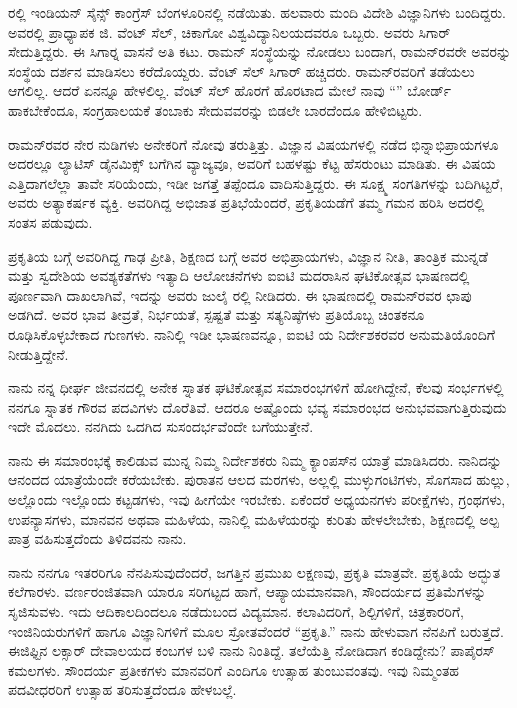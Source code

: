ರಲ್ಲಿ ಇಂಡಿಯನ್ ಸೈನ್ಸ್ ಕಾಂಗ್ರೆಸ್ ಬೆಂಗಳೂರಿನಲ್ಲಿ ನಡೆಯಿತು. ಹಲವಾರು ಮಂದಿ ವಿದೇಶಿ ವಿಜ್ಞಾನಿಗಳು ಬಂದಿದ್ದರು. ಅವರಲ್ಲಿ ಪ್ರಾಧ್ಯಾಪಕ ಜಿ. ವೆಂಟ್ ಸೆಲ್, ಚಿಕಾಗೋ ವಿಶ್ವವಿದ್ಯಾನಿಲಯದವರೂ ಒಬ್ಬರು. ಅವರು ಸಿಗಾರ್ ಸೇದುತ್ತಿದ್ದರು. ಈ ಸಿಗಾರ್‍ನ ವಾಸನೆ ಅತಿ ಕಟು. ರಾಮನ್ ಸಂಸ್ಥೆಯನ್ನು ನೋಡಲು ಬಂದಾಗ, ರಾಮನ್‍ರವರೇ ಅವರನ್ನು ಸಂಸ್ಥೆಯ ದರ್ಶನ ಮಾಡಿಸಲು ಕರೆದೊಯ್ದರು. ವೆಂಟ್ ಸೆಲ್ ಸಿಗಾರ್ ಹಚ್ಚಿದರು. ರಾಮನ್‍ರವರಿಗೆ ತಡೆಯಲು ಆಗಲಿಲ್ಲ. ಆದರೆ ಏನನ್ನೂ ಹೇಳಲಿಲ್ಲ. ವೆಂಟ್ ಸೆಲ್ ಹೊರಗೆ ಹೊರಟಾದ ಮೇಲೆ ನಾವು “” ಬೋರ್ಡ್ ಹಾಕಬೇಕೆಂದೂ, ಸಂಗ್ರಹಾಲಯಕೆ ತಂಬಾಕು ಸೇದುವವರನ್ನು ಬಿಡಲೇ ಬಾರದೆಂದೂ ಹೇಳಿಬಿಟ್ಟರು.

\vskip 2pt

ರಾಮನ್‍ರವರ ನೇರ ನುಡಿಗಳು ಅನೇಕರಿಗೆ ನೋವು ತರುತ್ತಿತ್ತು. ವಿಜ್ಞಾನ ವಿಷಯಗಳಲ್ಲಿ ನಡೆದ ಭಿನ್ನಾಭಿಪ್ರಾಯಗಳೂ ಅದರಲ್ಲೂ ಲ್ಯಾಟಿಸ್ ಡೈನಮಿಕ್ಸ್ ಬಗೆಗಿನ ವ್ಯಾಜ್ಯವೂ, ಅವರಿಗೆ ಬಹಳಷ್ಟು ಕೆಟ್ಟ ಹೆಸರುಂಟು ಮಾಡಿತು. ಈ ವಿಷಯ ಎತ್ತಿದಾಗಲೆಲ್ಲಾ ತಾವೇ ಸರಿಯೆಂದು, ಇಡೀ ಜಗತ್ತೆ ತಪ್ಪೆಂದೂ ವಾದಿಸುತ್ತಿದ್ದರು. ಈ ಸೂಕ್ಷ್ಮ ಸಂಗತಿಗಳನ್ನು ಬದಿಗಿಟ್ಟರೆ, ಅವರು ಅತ್ಯಾಕರ್ಷಕ ವ್ಯಕ್ತಿ. ಅವರಿಗಿದ್ದ ಅಭಿಜಾತ ಪ್ರತಿಭೆಯೆಂದರೆ, ಪ್ರಕೃತಿಯಡೆಗೆ ತಮ್ಮ ಗಮನ ಹರಿಸಿ ಅದರಲ್ಲಿ ಸಂತಸ ಪಡುವುದು.

\vskip 2pt

ಪ್ರಕೃತಿಯ ಬಗ್ಗೆ ಅವರಿಗಿದ್ದ ಗಾಢ ಪ್ರೀತಿ, ಶಿಕ್ಷಣದ ಬಗ್ಗೆ ಅವರ ಅಭಿಪ್ರಾಯಗಳು, ವಿಜ್ಞಾನ ನೀತಿ, ತಾಂತ್ರಿಕ ಮುನ್ನಡೆ ಮತ್ತು ಸ್ವದೇಶಿಯ ಅವಶ್ಯಕತೆಗಳು ಇತ್ಯಾದಿ ಆಲೋಚನೆಗಳು ಐಐಟಿ ಮದರಾಸಿನ ಘಟಿಕೋತ್ಸವ ಭಾಷಣದಲ್ಲಿ ಪೂರ್ಣವಾಗಿ ದಾಖಲಾಗಿವೆ, ಇದನ್ನು ಅವರು  ಜುಲೈ ರಲ್ಲಿ ನೀಡಿದರು. ಈ ಭಾಷಣದಲ್ಲಿ ರಾಮನ್‍ರವರ ಛಾಪು ಅಡಗಿದೆ. ಅವರ ಭಾವ ತೀವ್ರತೆ, ನಿರ್ಭಯತೆ, ಸ್ಪಷ್ಟತೆ ಮತ್ತು ಸತ್ಯನಿಷ್ಠೆಗಳು ಪ್ರತಿಯೊಬ್ಬ ಚಿಂತಕನೂ ರೂಢಿಸಿಕೊಳ್ಳಬೇಕಾದ ಗುಣಗಳು. ನಾನಿಲ್ಲಿ ಇಡೀ ಭಾಷಣವನ್ನೂ, ಐಐಟಿ ಯ ನಿರ್ದೇಶಕರವರ ಅನುಮತಿಯೊಂದಿಗೆ ನೀಡುತ್ತಿದ್ದೇನೆ.



ನಾನು ನನ್ನ ಧೀರ್ಘ ಜೀವನದಲ್ಲಿ ಅನೇಕ ಸ್ನಾತಕ ಘಟಿಕೋತ್ಸವ ಸಮಾರಂಭಗಳಿಗೆ ಹೋಗಿದ್ದೇನೆ, ಕೆಲವು ಸಂರ್ಭಗಳಲ್ಲಿ ನನಗೂ ಸ್ನಾತಕ ಗೌರವ ಪದವಿಗಳು ದೊರೆತಿವೆ. ಆದರೂ ಅಷ್ಟೊಂದು ಭವ್ಯ ಸಮಾರಂಭದ ಅನುಭವವಾಗುತ್ತಿರುವುದು ಇದೇ ಮೊದಲು. ನನಗಿದು ಒದಗಿದ ಸುಸಂದರ್ಭವೆಂದೇ ಬಗೆಯುತ್ತೇನೆ.

ನಾನು ಈ ಸಮಾರಂಭಕ್ಕೆ ಕಾಲಿಡುವ ಮುನ್ನ ನಿಮ್ಮ ನಿರ್ದೇಶಕರು ನಿಮ್ಮ ಕ್ಯಾಂಪಸ್‍ನ ಯಾತ್ರೆ ಮಾಡಿಸಿದರು. ನಾನಿದನ್ನು ಆನಂದದ ಯಾತ್ರೆಯೆಂದೇ ಕರೆಯಬೇಕು. ಪುರಾತನ ಆಲದ ಮರಗಳು, ಅಲ್ಲಲ್ಲಿ ಮುಳ್ಳುಗಂಟಿಗಳು, ಸೊಗಸಾದ ಹುಲ್ಲು, ಅಲ್ಲೊಂದು ಇಲ್ಲೊಂದು ಕಟ್ಟಡಗಳು,\enginline{-} ಇವು ಹೀಗೆಯೇ ಇರಬೇಕು. ಏಕೆಂದರೆ ಅಧ್ಯಯನಗಳು ಪರೀಕ್ಷೆಗಳು, ಗ್ರಂಥಗಳು, ಉಪನ್ಯಾಸಗಳು, ಮಾನವನ ಅಥವಾ ಮಹಿಳೆಯ, ನಾನಿಲ್ಲಿ ಮಹಿಳೆಯರನ್ನು ಕುರಿತು ಹೇಳಲೇಬೇಕು, ಶಿಕ್ಷಣದಲ್ಲಿ ಅಲ್ಪ ಪಾತ್ರ ವಹಿಸುತ್ತದೆಂದು ತಿಳಿದವನು ನಾನು.

\newpage

ನಾನು ನನಗೂ ಇತರರಿಗೂ ನೆನಪಿಸುವುದೆಂದರೆ, ಜಗತ್ತಿನ ಪ್ರಮುಖ ಲಕ್ಷಣವು, ಪ್ರಕೃತಿ ಮಾತ್ರವೇ. ಪ್ರಕೃತಿಯೆ ಅದ್ಭುತ ಕಲೆಗಾರಳು. ವರ್ಣರಂಜಿತವಾಗಿ ಯಾರೂ ಸರಿಗಟ್ಟದ ಹಾಗೆ, ಆಪ್ಯಾಯಮಾನವಾಗಿ, ಸೌಂದರ್ಯದ ಪ್ರತಿಮೆಗಳನ್ನು ಸೃಜಿಸುವಳು. ಇದು ಆದಿಕಾಲದಿಂದಲೂ ನಡೆದುಬಂದ ವಿದ್ಯಮಾನ. ಕಲಾವಿದರಿಗೆ, ಶಿಲ್ಪಿಗಳಿಗೆ, ಚಿತ್ರಕಾರರಿಗೆ, ಇಂಜಿನಿಯರುಗಳಿಗೆ ಹಾಗೂ ವಿಜ್ಞಾನಿಗಳಿಗೆ ಮೂಲ ಸ್ರೋತವೆಂದರೆ “ಪ್ರಕೃತಿ.” ನಾನು ಹೇಳುವಾಗ ನೆನಪಿಗೆ ಬರುತ್ತದೆ. ಈಜಿಫ್ಟಿನ ಲಕ್ಸಾರ್ ದೇವಾಲಯದ ಕಂಬಗಳ ಬಳಿ ನಾನು ನಿಂತಿದ್ದೆ. ತಲೆಯೆತ್ತಿ ನೋಡಿದಾಗ ಕಂಡಿದ್ದೇನು? ಪಾಪೈರಸ್ ಕಮಲಗಳು. ಸೌಂದರ್ಯ ಪ್ರತೀಕಗಳು ಮಾನವರಿಗೆ ಎಂದಿಗೂ ಉತ್ಸಾಹ ತುಂಬುವಂತವು. ಇವು ನಿಮ್ಮಂತಹ ಪದವೀಧರರಿಗೆ ಉತ್ಸಾಹ ತರಿಸುತ್ತದೆಂದೂ ಹೇಳಬಲ್ಲೆ.

